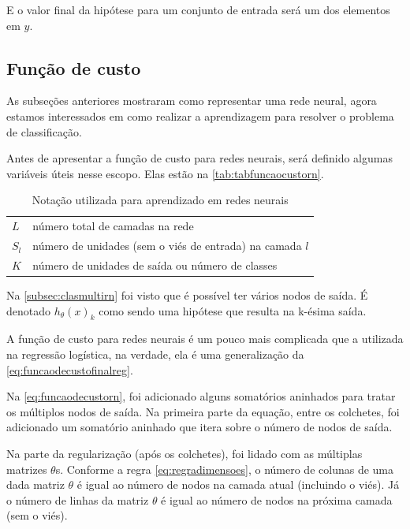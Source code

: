 E o valor final da hipótese para um conjunto de entrada será um dos elementos em $y$.


\subsection{Função de custo}

As subseções anteriores mostraram como representar uma rede neural, agora estamos interessados em como realizar a aprendizagem para resolver o problema de classificação.

Antes de apresentar a função de custo para redes neurais, será definido algumas variáveis úteis nesse escopo. Elas estão na \autoref{tab:tabfuncaocustorn}.

\begin{table}[!htb]
\begin{center}
\caption{Notação utilizada para aprendizado em redes neurais} \label{tab:tabfuncaocustorn}
\begin{tabular}{m{2cm}m{12.0cm}}
  \toprule
  $L$ 	& número total de camadas na rede\\
  $S_l$	& número de unidades (sem o viés de entrada) na camada $l$ \\
  $K$   & número de unidades de saída ou número de classes  \\
  \bottomrule
\end{tabular}
\end{center}
\end{table}

Na \autoref{subsec:clasmultirn} foi visto que é possível ter vários nodos de saída. É denotado $h_{\theta}(x)_k$ como sendo uma hipótese que resulta na k-ésima saída.

A função de custo para redes neurais é um pouco mais complicada que a utilizada na regressão logística, na verdade, ela é uma generalização da \autoref{eq:funcaodecustofinalreg}. 

Na \autoref{eq:funcaodecustorn}, foi adicionado alguns somatórios aninhados para tratar os múltiplos nodos de saída. Na primeira parte da equação, entre os colchetes, foi adicionado um somatório aninhado que itera sobre o número de nodos de saída.

Na parte da regularização (após os colchetes), foi lidado com as múltiplas matrizes $\theta$s. Conforme a regra \ref{eq:regradimensoes}, o número de colunas de uma dada matriz $\theta$ é igual ao número de nodos na camada atual (incluindo o viés). Já o número de linhas da matriz $\theta$ é igual ao número de nodos na próxima camada (sem o viés). 

